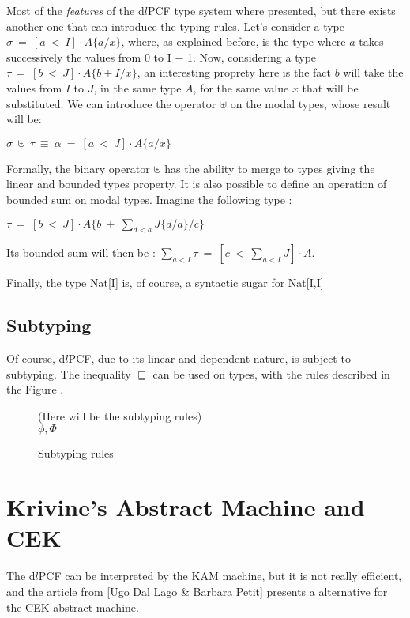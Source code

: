\documentclass[a4paper,12pt]{report}
\begin{document}
Most of the \emph{features} of the d$l$PCF type system where presented, but
there exists another one that can introduce the typing rules. Let's consider a
type $\sigma~=~[a~<~I] \cdot A\{a/x\}$, where, as explained before, is the type
where $a$ takes successively the values from 0 to I $-$ 1. Now, considering a
type $\tau~=~[b~<~J] \cdot A\{b+I/x\}$, an interesting proprety here is the fact
$b$ will take the values from $I$ to $J$, in the same type $A$, for the same value
$x$ that will be substituted. We can introduce the operator $\uplus$ on the
modal types, whose result will be:

\begin{center}
$\sigma~\uplus~\tau~\equiv~\alpha~=~[a~<~J] \cdot A\{a/x\}$
\end{center}

Formally, the binary operator $\uplus$ has the ability to merge to types giving
the linear and bounded types property. It is also possible to define an
operation of bounded sum on modal types. Imagine the following type :

\begin{center}
  $\tau~=~[b~<~J] \cdot A\{b~+~\sum_{d<a}J\{d/a\}/c\}$
\end{center}

Its bounded sum will then be : $\sum_{a<I} \tau ~=~ [c~<~\sum_{a<I}J] \cdot A$. 

Finally, the type Nat[I] is, of course, a syntactic sugar for Nat[I,I]

\subsection{Subtyping}

Of course, d$l$PCF, due to its linear and dependent nature, is subject to
subtyping. The inequality $\sqsubseteq$ can be used on types, with the rules
described in the Figure \label{subtyping}.

\begin{figure}
  (Here will be the subtyping rules) \\
  $\phi , \Phi$
  \caption{Subtyping rules}
  \label{subtyping}
\end{figure}

\section{Krivine's Abstract Machine and CEK}

The d$l$PCF can be interpreted by the KAM machine, but it is not really
efficient, and the article from [Ugo Dal Lago \& Barbara Petit] presents a
alternative for the CEK abstract machine.
\end{document}
